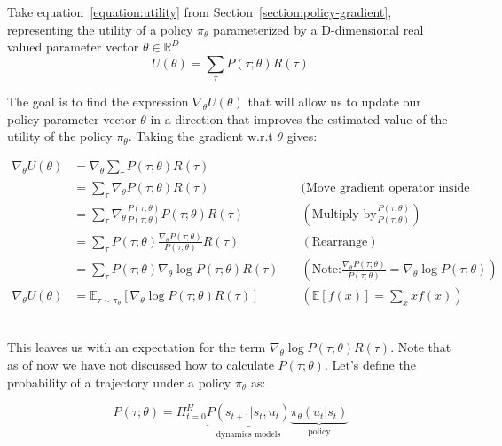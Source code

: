 \documentclass{../main.tex}{subfiles}
\begin{document}
Take equation~\ref{equation:utility} from Section~\ref{section:policy-gradient}, representing the utility of a policy $\pi_{\theta}$ parameterized by a D-dimensional real valued parameter vector $\theta \in \mathbb{R}^D$
\begin{equation}
U(\theta) = \sum_{\tau}P(\tau ; \theta) R(\tau)
\end{equation}

The goal is to find the expression $\nabla_{\theta} U(\theta)$ that will allow us to update our policy parameter vector $\theta$ in a direction that improves the estimated value of the utility of the policy $\pi_{\theta}$. Taking the gradient w.r.t $\theta$ gives:

\begin{equation}\label{equation:expectance-gradient}
\begin{aligned}
\nabla_{\theta} U(\theta) & = \nabla_{\theta} \sum_{\tau}P(\tau ; \theta) R(\tau) \\
& =  \sum_{\tau} \nabla_{\theta} P(\tau ; \theta) R(\tau) \quad &\text{(Move gradient operator inside sum)} \\
& =  \sum_{\tau} \nabla_{\theta} \frac{P(\tau; \theta)}{P(\tau ; \theta)} P(\tau ; \theta) R(\tau) \quad & (\text{Multiply by} \frac{P(\tau; \theta)}{P(\tau ; \theta)}  )  \\
& =  \sum_{\tau} P(\tau; \theta) \frac{\nabla_{\theta} P(\tau ; \theta)}{P(\tau ; \theta)} R(\tau) \quad & (\text{Rearrange}) \\
& =  \sum_{\tau} P(\tau; \theta) \nabla_{\theta} \log P(\tau ; \theta) R(\tau) \quad & (\text{Note:} \frac{\nabla_{\theta}P(\tau; \theta)}{P(\tau; \theta)} = \nabla_{\theta} \log P(\tau; \theta) ) \\
\nabla_{\theta} U(\theta) & = \mathbb{E}_{\tau \sim \pi_{\theta}} [\nabla_{\theta} \log P(\tau ; \theta) R(\tau)] & (\mathbb{E}[f(x)] = \sum_{x} xf(x))\\
\end{aligned}
\end{equation}

\begin{equation}
\end{equation}

This leaves us with an expectation for the term $\nabla_{\theta} \log P(\tau ; \theta) R(\tau)$. Note that as of now we have not discussed how to calculate $P(\tau ; \theta)$. Let's define the probability of a trajectory under a policy $\pi_{\theta}$ as: 

\begin{equation}
P (\tau; \theta) = \Pi_{t=0}^{H} \underbrace{P (s_{t+1} | s_t, u_t)}_\textrm{dynamics models} \underbrace{\pi_{\theta} (u_t | s_t)}_\textrm{policy}
\end{equation}
\end{document}
